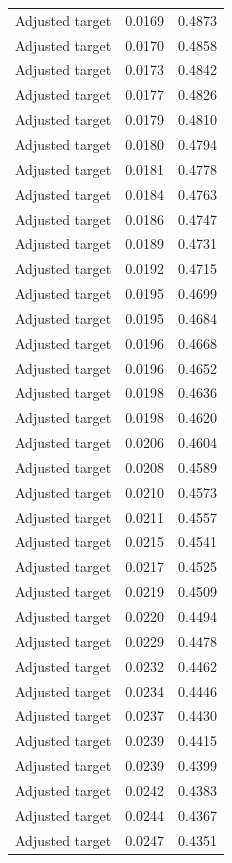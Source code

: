 \begin{table}[htbp]
\begin{tabular}{lll}
Adjusted target & 0.0169 & 0.4873 \\
Adjusted target & 0.0170 & 0.4858 \\
Adjusted target & 0.0173 & 0.4842 \\
Adjusted target & 0.0177 & 0.4826 \\
Adjusted target & 0.0179 & 0.4810 \\
Adjusted target & 0.0180 & 0.4794 \\
Adjusted target & 0.0181 & 0.4778 \\
Adjusted target & 0.0184 & 0.4763 \\
Adjusted target & 0.0186 & 0.4747 \\
Adjusted target & 0.0189 & 0.4731 \\
Adjusted target & 0.0192 & 0.4715 \\
Adjusted target & 0.0195 & 0.4699 \\
Adjusted target & 0.0195 & 0.4684 \\
Adjusted target & 0.0196 & 0.4668 \\
Adjusted target & 0.0196 & 0.4652 \\
Adjusted target & 0.0198 & 0.4636 \\
Adjusted target & 0.0198 & 0.4620 \\
Adjusted target & 0.0206 & 0.4604 \\
Adjusted target & 0.0208 & 0.4589 \\
Adjusted target & 0.0210 & 0.4573 \\
Adjusted target & 0.0211 & 0.4557 \\
Adjusted target & 0.0215 & 0.4541 \\
Adjusted target & 0.0217 & 0.4525 \\
Adjusted target & 0.0219 & 0.4509 \\
Adjusted target & 0.0220 & 0.4494 \\
Adjusted target & 0.0229 & 0.4478 \\
Adjusted target & 0.0232 & 0.4462 \\
Adjusted target & 0.0234 & 0.4446 \\
Adjusted target & 0.0237 & 0.4430 \\
Adjusted target & 0.0239 & 0.4415 \\
Adjusted target & 0.0239 & 0.4399 \\
Adjusted target & 0.0242 & 0.4383 \\
Adjusted target & 0.0244 & 0.4367 \\
Adjusted target & 0.0247 & 0.4351 \\

\end{tabular}
\end{table}
